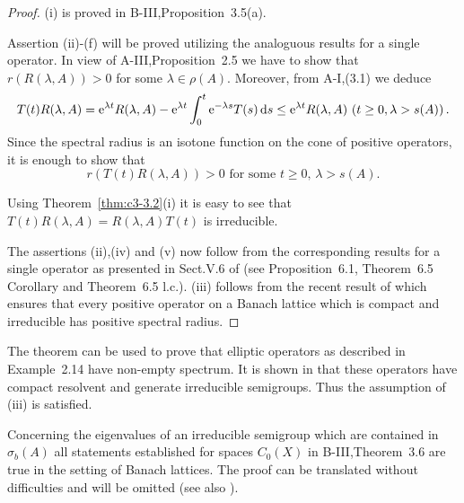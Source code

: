 \begin{proof}
	(i) is proved in B-III,Proposition~3.5(a).
	
	Assertion (ii)-(f) will be proved utilizing the analoguous results for a single operator.
	In view of A-III,Proposition~2.5 we have to show that $r(R(\lambda,A)) > 0$ for some $\lambda \in \rho(A)$.
	Moreover, from A-I,(3.1) we deduce
	\begin{align*}
		T(t)R(\lambda,A) = \mathrm{e}^{\lambda t}R(\lambda,A) - \mathrm{e}^{\lambda t}\int_{0}^{t} \mathrm{e}^{-\lambda s}T(s)\mathop{}\!\mathrm{d}{s} \leq \mathrm{e}^{\lambda t}R(\lambda,A) \ (t\geq 0, \lambda>s(A))\,.
	\end{align*}
	Since the spectral radius is an isotone function on the cone of positive operators, it is enough to show that
	\begin{equation}\label{eq:c3-3.12}
		r(T(t)R(\lambda,A)) > 0 \text{ for some } t \geq 0,\, \lambda > s(A).
	\end{equation}
	
	Using Theorem~\ref{thm:c3-3.2}(i) it is easy to see that $T(t)R(\lambda,A) = R(\lambda,A)T(t)$ is irreducible.
	
	The assertions (ii),(iv) and (v) now follow from the corresponding results for a single operator as presented in Sect.V.6 of \citet{schaefer:1974} (see Proposition~6.1, Theorem~6.5 Corollary and Theorem~6.5 l.c.).
	(iii) follows from the recent result of \citet{depagter:1986} which ensures that every positive operator on a Banach lattice which is compact and irreducible has positive spectral radius.
\end{proof}

The theorem can be used to prove that elliptic operators as described in Example~2.14 have non-empty spectrum.
It is shown in \citet{amann:1983} that these operators have compact resolvent and generate irreducible semigroups.
Thus the assumption of (iii) is satisfied.

Concerning the eigenvalues of an irreducible semigroup which are contained in $\sigma_{b}(A)$ all statements established for spaces $C_{0}(X)$ in B-III,Theorem~3.6 are true in the setting of Banach lattices.
The proof can be translated without difficulties and will be omitted (see also \citet[Theorem~2.6]{greiner:1982}).

